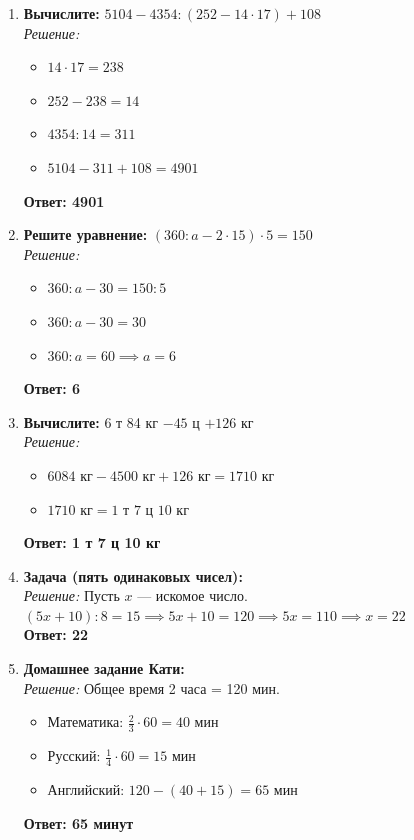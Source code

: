 \begin{enumerate}
    \item \textbf{Вычислите:} $5104 - 4354 : (252 - 14 \cdot 17) + 108$ \\
    \textit{Решение:}
    \begin{itemize}
        \item $14 \cdot 17 = 238$
        \item $252 - 238 = 14$
        \item $4354 : 14 = 311$
        \item $5104 - 311 + 108 = 4901$
    \end{itemize}
    \textbf{Ответ: 4901}

    \item \textbf{Решите уравнение:} $(360:a - 2 \cdot 15) \cdot 5 = 150$ \\
    \textit{Решение:}
    \begin{itemize}
        \item $360:a - 30 = 150 : 5$
        \item $360:a - 30 = 30$
        \item $360:a = 60 \implies a = 6$
    \end{itemize}
    \textbf{Ответ: 6}

    \item \textbf{Вычислите:} 6 т 84 кг $- 45$ ц $+ 126$ кг \\
    \textit{Решение:}
    \begin{itemize}
        \item $6084 \text{ кг} - 4500 \text{ кг} + 126 \text{ кг} = 1710 \text{ кг}$
        \item $1710 \text{ кг} = 1 \text{ т } 7 \text{ ц } 10 \text{ кг}$
    \end{itemize}
    \textbf{Ответ: 1 т 7 ц 10 кг}

    \item \textbf{Задача (пять одинаковых чисел):} \\
    \textit{Решение:} Пусть $x$ — искомое число. \\
    $(5x + 10) : 8 = 15 \implies 5x + 10 = 120 \implies 5x = 110 \implies x = 22$ \\
    \textbf{Ответ: 22}

    \item \textbf{Домашнее задание Кати:} \\
    \textit{Решение:} Общее время 2 часа = 120 мин.
    \begin{itemize}
        \item Математика: $\frac{2}{3} \cdot 60 = 40$ мин
        \item Русский: $\frac{1}{4} \cdot 60 = 15$ мин
        \item Английский: $120 - (40 + 15) = 65$ мин
    \end{itemize}
    \textbf{Ответ: 65 минут}


\end{enumerate}
